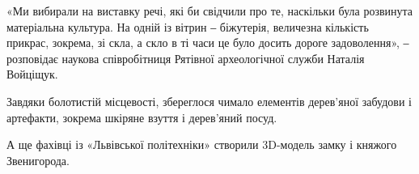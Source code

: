 «Ми вибирали на виставку речі, які би свідчили про те, наскільки була розвинута
матеріальна культура. На одній із вітрин ‒ біжутерія, величезна кількість
прикрас, зокрема, зі скла, а скло в ті часи це було досить дороге задоволення»,
‒ розповідає наукова співробітниця Рятівної археологічної служби Наталія
Войціщук.

Завдяки болотистій місцевості, збереглося чимало елементів дерев'яної забудови
і артефакти, зокрема шкіряне взуття і дерев'яний посуд.

А ще фахівці із «Львівської політехніки» створили 3D-модель замку і княжого
Звенигорода.
